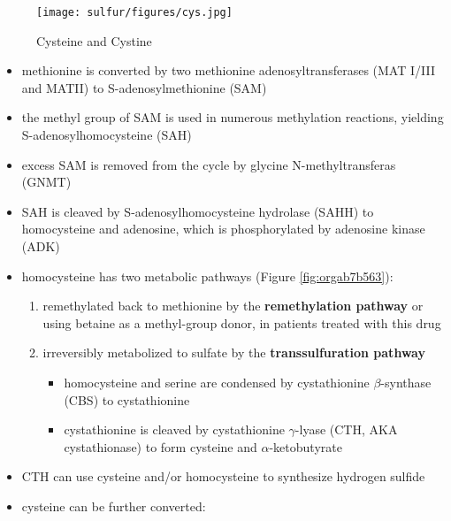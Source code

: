 \documentclass[12pt]{scrartcl}
\begin{document}
\begin{center}
\begin{center}
\begin{center}
\chemnameinit{}
\chemnameinit{}
\hspace{20}
\chemnameinit{}
\hspace{20}
\end{center}


\begin{figure}[htbp]
\centering
\texttt{[image: sulfur/figures/cys.jpg]}
\caption{\label{fig:org85de361}Cysteine and Cystine}
\end{figure}

\begin{itemize}
\item methionine is converted by two methionine adenosyltransferases (MAT
I/III and MATII) to S-adenosylmethionine (SAM)
\item the methyl group of SAM is used in numerous methylation reactions,
yielding S-adenosylhomocysteine (SAH)
\item excess SAM is removed from the cycle by glycine N-methyltransferas (GNMT)
\item SAH is cleaved by S-adenosylhomocysteine hydrolase (SAHH) to
homocysteine and adenosine, which is phosphorylated by adenosine
kinase (ADK)
\item homocysteine has two metabolic pathways (Figure \ref{fig:orgab7b563}):
\begin{enumerate}
\item remethylated back to methionine by the \textbf{remethylation pathway} or
using betaine as a methyl-group donor, in patients treated with
this drug
\item irreversibly metabolized to sulfate
by the \textbf{transsulfuration pathway}
\begin{itemize}
\item homocysteine and serine are condensed by cystathionine
\(\beta\)-synthase (CBS) to cystathionine
\item cystathionine is cleaved by cystathionine \(\gamma\)-lyase (CTH, AKA cystathionase) to
form cysteine and \(\alpha\)-ketobutyrate
\end{itemize}
\end{enumerate}
\item CTH can use cysteine and/or homocysteine to synthesize hydrogen
sulfide
\item cysteine can be further converted:

\end{itemize}
\end{center}
\end{center}
\end{document}
